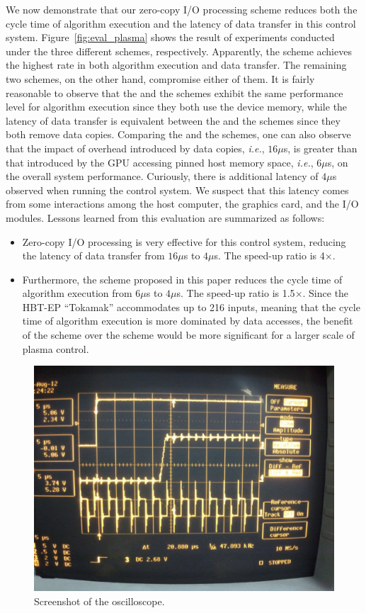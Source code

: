We now demonstrate that our zero-copy I/O processing scheme reduces both
the cycle time of algorithm execution and the latency of data transfer
in this control system.
Figure~\ref{fig:eval_plasma} shows the result of experiments conducted
under the three different schemes, respectively.
Apparently, the {\dm} scheme achieves the highest rate in both algorithm
execution and data transfer.
The remaining two schemes, on the other hand, compromise either of them.
It is fairly reasonable to observe that the {\hd} and the {\dm} schemes
exhibit the same performance level for algorithm execution since they
both use the device memory, while the latency of data transfer is
equivalent between the {\hp} and the {\dm} schemes since they both
remove data copies.
Comparing the {\hd} and the {\hp} schemes, one can also observe that the
impact of overhead introduced by data copies, \textit{i.e.}, $16\mu$s, is
greater than that introduced by the GPU accessing pinned host memory
space, \textit{i.e.}, $6\mu$s, on the overall system performance.
Curiously, there is additional latency of $4\mu$s observed when running
the control system.
We suspect that this latency comes from some interactions among the host
computer, the graphics card, and the I/O modules.
Lessons learned from this evaluation are summarized as follows:
\begin{itemize}
 \item Zero-copy I/O processing is very effective for this control
       system, reducing the latency of data transfer from $16\mu$s to
       $4\mu$s.
       The speed-up ratio is 4$\times$.
 \item Furthermore, the {\dm} scheme proposed in this paper reduces the
       cycle time of algorithm execution from $6\mu$s to $4\mu$s.
       The speed-up ratio is 1.5$\times$.
       Since the HBT-EP ``Tokamak'' accommodates up to 216 inputs,
       meaning that the cycle time of algorithm execution is more
       dominated by data accesses, the benefit of the {\dm} scheme over
       the {\hp} scheme would be more significant for a larger scale of
       plasma control.
\end{itemize}

\begin{figure}[t]
 \centering
 \includegraphics[width=0.85\hsize]{eps/oscilloscope.eps}
 \caption{Screenshot of the oscilloscope.}
 \label{fig:oscilloscope}
\end{figure}

